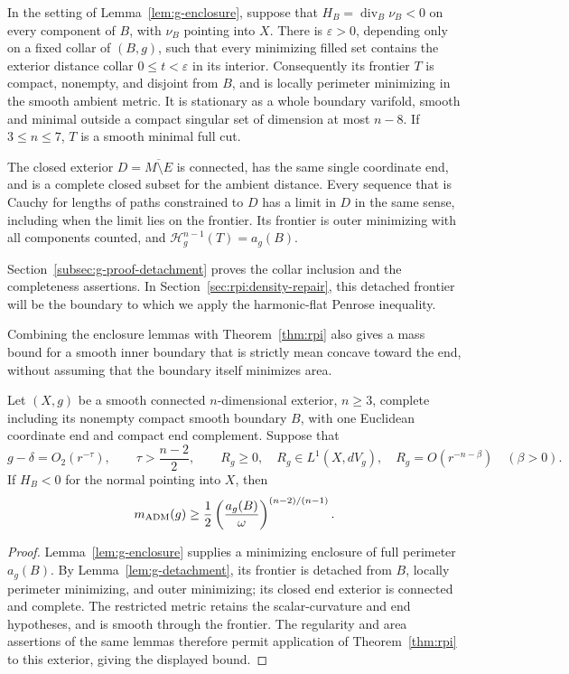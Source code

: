 \begin{lemma}
\label{lem:g-detachment}
In the setting of Lemma~\ref{lem:g-enclosure}, suppose that
$H_B=\operatorname{div}_B\nu_B<0$ on every component of $B$, with
$\nu_B$ pointing into $X$.  There is $\varepsilon>0$, depending only
on a fixed collar of $(B,g)$, such that every minimizing filled set
contains the exterior distance collar $0\le t<\varepsilon$ in its
interior.  Consequently its frontier $T$ is compact, nonempty, and
disjoint from $B$, and is locally perimeter minimizing in the smooth
ambient metric.  It is stationary as a whole boundary varifold,
smooth and minimal outside a compact singular set of dimension at
most $n-8$.  If $3\le n\le7$, $T$ is a smooth minimal full cut.

The closed exterior $D=\overline{M\setminus E}$ is connected, has the
same single coordinate end, and is a complete closed subset for the
ambient distance.  Every sequence that is Cauchy for lengths of paths
constrained to $D$ has a limit in $D$ in the same sense, including
when the limit lies on the frontier.
Its frontier is outer
minimizing with all components counted, and
$\mathcal H^{n-1}_g(T)=a_g(B)$.
\end{lemma}

Section~\ref{subsec:g-proof-detachment} proves the collar inclusion and
the completeness assertions. In Section~\ref{sec:rpi:density-repair},
this detached frontier will be the boundary to which we apply the
harmonic-flat Penrose inequality.

Combining the enclosure lemmas with Theorem~\ref{thm:rpi} also gives a
mass bound for a smooth inner boundary that is strictly mean concave
toward the end, without assuming that the boundary itself minimizes area.

\begin{corollary}
\label{cor:g-strict-barrier-penrose}
Let $(X,g)$ be a smooth connected $n$-dimensional exterior, $n\ge3$,
complete including its
nonempty compact smooth boundary $B$, with one Euclidean coordinate
end and compact end complement. Suppose that
\[
 g-\delta=O_2(r^{-\tau}),\qquad \tau>\frac{n-2}{2},\qquad
 R_g\ge0,\quad R_g\in L^1(X,dV_g),\quad
 R_g=O(r^{-n-\beta})\quad(\beta>0).
\]
If $H_B<0$ for the normal pointing into $X$, then
\[
 m_{\rm ADM}(g)\ge\frac12
 \left(\frac{a_g(B)}{\omega}\right)^{(n-2)/(n-1)}.
\]
\end{corollary}

\begin{proof}
Lemma~\ref{lem:g-enclosure} supplies a minimizing enclosure of full
perimeter $a_g(B)$. By Lemma~\ref{lem:g-detachment}, its frontier
is detached from $B$, locally perimeter minimizing, and outer
minimizing; its closed end exterior is connected and complete.
The restricted metric retains the scalar-curvature and end hypotheses,
and is smooth through the frontier. The regularity and area assertions
of the same lemmas therefore permit application of
Theorem~\ref{thm:rpi} to this exterior, giving the displayed bound.
\end{proof}
